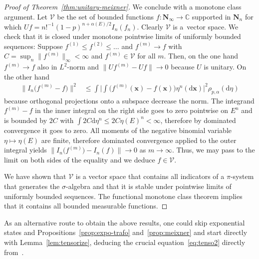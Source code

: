 \documentclass[pdftex]{sigma}
\numberwithin{equation}{section}
\newcommand{\C}{\mathbb{C}}
\newcommand{\dd}{\mathrm{d}} %
\newcommand{\vect}[1]{\boldsymbol{#1}}
\newcommand{\1}{\mathbbm{1}}
\begin{document}
\begin{proof}[Proof of Theorem~\ref{thm:unitary-meixner}]
	We conclude with a monotone class argument. Let $\mathcal V$ be the set of bounded functions $f\colon\mathbf N_\infty\to \C$ supported in $\mathbf N_n$ for which $U f = n!^{-1} (1-p)^{n+\alpha(E)/2} I_n(f_n)$. Clearly $\mathcal V$ is a~vector space. We check that it is closed under monotone pointwise limits of uniformly bounded sequences: Suppose $f^{(1)} \leq f^{(2)} \leq \ldots$ and $f^{(m)} \to f$ with $C = \sup_n\bigl\|f^{(m)}\bigr\|_\infty< \infty$ and $f^{(m)}\in \mathcal V$ for all $m$. Then, on the one hand $f^{(m)} \to f$ also in $L^2$-norm and $\bigl\| Uf^{(m)} - U f\bigr\| \to 0$ because $U$ is unitary. On the other hand 	
	\begin{align*}
		\bigl\|I_n\bigl(f^{(m)}- f\bigr)\bigr\|^2 & \leq \int \biggl| \int \bigl(f^{(m)}(\vect x) - f(\vect x) \bigr) \eta^n(\dd \vect x) \biggr|^2 \rho_{p,\alpha}(\dd \eta)
	\end{align*}
	because orthogonal projections onto a subspace decrease the norm. The integrand $f^{(m)} -f$ in the inner integral on the right side goes to zero pointwise on $E^n$ and is bounded by $2C$ with $\int 2 C \dd \eta^{n} \leq 2 C\eta(E)^n<\infty$, therefore by dominated convergence it goes to zero. All moments of the negative binomial variable $\eta\mapsto \eta(E)$ are finite, therefore dominated convergence applied to the outer integral yields $\bigl\|I_n\bigl(f^{(m)}\bigr) - I_n(f)\bigr\|\to 0$ as $m\to \infty$. Thus, we may pass to the limit on both sides of the equality  and we deduce $f\in \mathcal V$.
	
	We have shown that $\mathcal V$ is a vector space that contains all indicators of a $\pi$-system that generates the $\sigma$-algebra and that it is stable under pointwise limits of uniformly bounded sequences. The functional monotone class theorem \cite[Theorem 2.12.9]{bogachev-vol1} implies that it contains all bounded measurable functions.
\end{proof}

As an alternative route to obtain the above results, one could skip exponential states and Propositions~\ref{prop:expo-trafo} and~\ref{prop:meixner} and start directly with Lemma~\ref{lem:tensorize}, deducing the crucial equation~\eqref{eq:tenso2} directly from~\cite[Theorem 3.1]{carinci2019orthogonal}.

\appendix
\end{document}
